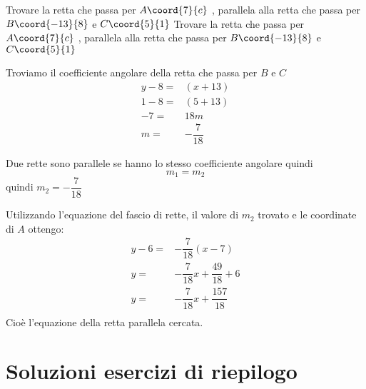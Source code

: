 \begin{exercise}
	Trovare la retta che passa per $A\coord{7}{c}$ , parallela alla retta che passa per $B\coord{-13}{8}$ e $C\coord{5}{1}$
	\tcblower
	Trovare la retta che passa per $A\coord{7}{c}$ , parallela alla retta che passa per $B\coord{-13}{8}$ e $C\coord{5}{1}$
	
	Troviamo il coefficiente angolare della retta che passa per $B$ e $C$
	\begin{align*}
		y-8=&(x+13)\\
		1-8=&(5+13)\\
		-7=&18m\\
		m=&-\dfrac{7}{18}
	\end{align*}
	
		Due rette sono parallele se hanno lo stesso coefficiente angolare quindi \[m_1=m_2 \]
		quindi $m_2=-\dfrac{7}{18}$ 
		
		Utilizzando l'equazione del fascio di rette, il valore di $m_2$ trovato e le coordinate di $A$ ottengo:
		\begin{align*}
			y-6=&-\dfrac{7}{18}(x-7)\\
			y=&-\dfrac{7}{18}x+\dfrac{49}{18}+6\\
			y=&-\dfrac{7}{18}x+\dfrac{157}{18}\\
		\end{align*}
		Cioè l'equazione della retta parallela cercata.	
\end{exercise}	
\tcbstoprecording
\newpage
\section{Soluzioni esercizi di riepilogo}
\tcbinputrecords							